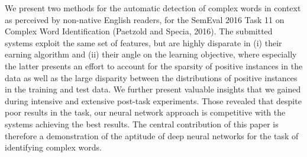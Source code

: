 We present two methods for the automatic detection of complex words in context as perceived by non-native English readers, for the SemEval 2016 Task 11 on Complex Word Identification (Paetzold and Specia, 2016). The submitted systems exploit the same set of features, but are highly disparate in (i) their earning algorithm and (ii) their angle on the learning objective, where especially the latter presents an effort to account for the sparsity of positive instances in the data as well as the large disparity between the distributions of positive instances in the training and test data. We further present valuable insights that we gained during intensive and extensive post-task experiments. Those revealed that despite poor results in the task, our neural network approach is competitive with the systems achieving the best results. The central contribution of this paper is therefore a demonstration of the aptitude of deep neural networks for the task of identifying complex words.
